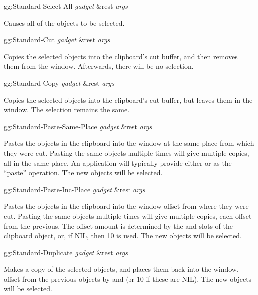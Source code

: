 \begin{programexample}
gg:Standard-Select-All {\it gadget} \&rest {\it args} \value{function}
\end{programexample}
Causes all of the objects to be selected.

\begin{programexample}
gg:Standard-Cut {\it gadget} \&rest {\it args} \value{function}
\end{programexample}
Copies the selected objects into the clipboard's cut buffer, and then
removes them from the window.  Afterwards, there will be no selection.

\begin{programexample}
gg:Standard-Copy {\it gadget} \&rest {\it args} \value{function}
\end{programexample}
Copies the selected objects into the clipboard's cut buffer, but
leaves them in the window.  The selection remains the same.

\begin{programexample}
gg:Standard-Paste-Same-Place {\it gadget} \&rest {\it args} \value{function}
\end{programexample}
Pastes the objects in the clipboard into the window at the same place
from which they were cut.  Pasting the same objects multiple times
will give multiple copies, all in the same place.  An application will
typically provide either  or
 as the ``paste'' operation.  The new
objects will be selected.

\begin{programexample}
gg:Standard-Paste-Inc-Place {\it gadget} \&rest {\it args} \value{function}
\end{programexample}
Pastes the objects in the clipboard into the window offset from where
they were cut.  Pasting the same objects multiple times
will give multiple copies, each offset from the previous.  The offset
amount is determined by the  and  slots
of the clipboard object, or, if NIL, then 10 is used.  The new
objects will be selected.

\begin{programexample}
gg:Standard-Duplicate {\it gadget} \&rest {\it args} \value{function}
\end{programexample}
Makes a copy of the selected objects, and places them back into the
window, offset from the previous objects by  and
 (or 10 if these are NIL).  The new
objects will be selected.

